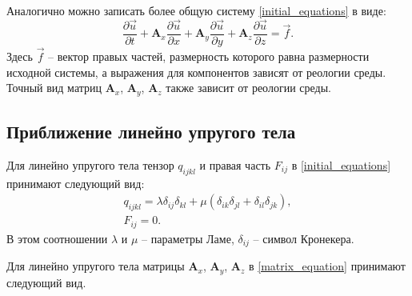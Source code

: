 Аналогично можно записать более общую систему \ref{initial_equations} в виде:
\begin{equation}
\label{matrix_equation}
\frac{\partial\vec{u}}{\partial{t}}+\mathbf{A}_x\frac{\partial\vec{u}}{\partial{x}}+
\mathbf{A}_y\frac{\partial\vec{u}}{\partial{y}}+
\mathbf{A}_z\frac{\partial\vec{u}}{\partial{z}}=\vec{f}.
\end{equation}
Здесь $\vec{f}$ -- вектор правых частей, размерность которого равна размерности исходной системы, а выражения для компонентов зависят от реологии среды. Точный вид матриц $\mathbf{A}_x$, $\mathbf{A}_y$, $\mathbf{A}_z$ также зависит от реологии среды.

\clearpage
\newpage

\subsection{Приближение линейно упругого тела}
\label{elastic_matrixes}

Для линейно упругого тела тензор $q_{ijkl}$ и правая часть $F_{ij}$ в \ref{initial_equations} принимают следующий вид:
\begin{eqnarray}
\label{tensor_qijkl_elastic}
q_{ijkl}=\lambda\delta_{ij}\delta_{kl}+\mu(\delta_{ik}\delta_{jl}+\delta_{il}
\delta_{jk}),\nonumber\\
F_{ij}=0.
\end{eqnarray}
В этом соотношении $\lambda$ и $\mu$ -- параметры Ламе, $\delta_{ij}$ -- символ Кронекера.

Для линейно упругого тела матрицы $\mathbf{A}_x$, $\mathbf{A}_y$, $\mathbf{A}_z$ в \ref{matrix_equation} принимают следующий вид.

